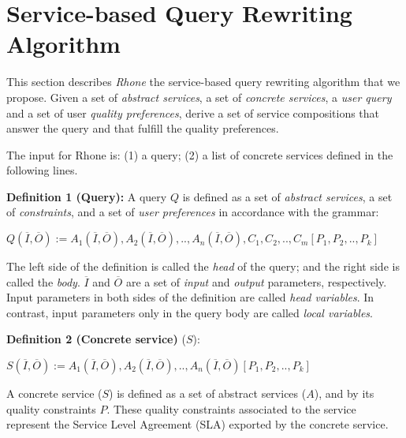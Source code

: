 \section{Service-based Query Rewriting Algorithm}
\label{sec:rhone} 
This section describes \textit{Rhone} the service-based query rewriting algorithm that we propose. Given
a set of \textit{abstract services}, a set of \textit{concrete services}, a
\textit{user query} and a set of user \textit{quality preferences}, derive a set
of service compositions that answer the query and that fulfill the quality preferences.

The  input for  Rhone  is: (1) a query; (2) a list of concrete services defined in the following lines.

\noindent \textbf{Definition 1 (Query):} 
A query $Q$ is defined as a set of \textit{abstract services}, a set of \textit{constraints}, and a set of \textit{user preferences} in accordance with the grammar: 

\begin{center}
$Q (\overline{I}, \overline{O}) := A_{1}(\overline{I}, \overline{O}), A_{2}(\overline{I}, \overline{O}), ..,  A_{n}(\overline{I}, \overline{O}),C_{1},C_{2}, .., C_{m}[P_{1},P_{2}, .., P_{k}]$
\end{center}  

The left side of the definition is called the \textit{head} of the query; and the right side is called the \textit{body}. 
$\overline{I}$ and $\overline{O}$ are a set of \textit{input} and \textit{output} parameters, respectively.
Input parameters in both sides of the definition are called \textit{head variables}.
In contrast, input parameters only in the query body are called \textit{local variables}.
%

\noindent \textbf{Definition 2 (Concrete service)}  ($S$):
\begin{center}
$S (\overline{I}, \overline{O}) := A_{1}(\overline{I}, \overline{O}), A_{2}(\overline{I}, \overline{O}), ..,  A_{n}(\overline{I}, \overline{O})[P_{1},P_{2}, .., P_{k}]$
\end{center}  

A concrete service ($S$) is defined as a set of abstract services ($A$), and by its quality constraints $P$. 
These quality constraints associated to the service represent the Service Level Agreement (SLA) exported by the concrete service.


